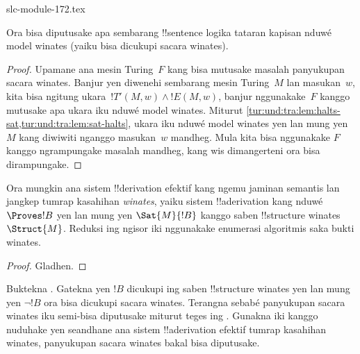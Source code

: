 \begin{filecontents*}[overwrite]{slc-module-172.tex}
\begin{thm}
  Ora bisa diputusake apa sembarang !!{sentence}
  logika tataran kapisan nduwé model winates
  (yaiku bisa dicukupi sacara winates).
\end{thm}

\begin{proof}
  Upamane ana mesin Turing~$F$ kang bisa mutusake
  masalah panyukupan sacara winates. Banjur yen
  diwenehi sembarang mesin Turing~$M$ lan
  masukan~$w$, kita bisa ngitung
  ukara~$!T'(M,w) \land !E(M,w)$, banjur
  nggunakake~$F$ kanggo mutusake apa ukara iku
  nduwé model winates. Miturut
  \cref{tur:und:tra:lem:halts-sat,tur:und:tra:lem:sat-halts},
  ukara iku nduwé model winates yen lan mung yen
  $M$ kang diwiwiti nganggo masukan~$w$ mandheg.
  Mula kita bisa nggunakake $F$ kanggo ngrampungake
  masalah mandheg, kang wis dimangerteni ora bisa
  dirampungake.
\end{proof}

\begin{cor}%
  Ora mungkin ana sistem !!{derivation} efektif kang ngemu
  jaminan semantis lan jangkep tumrap kasahihan
  \emph{winates}, yaiku
  sistem !!a{derivation} kang nduwé $\Proves !B$
  yen lan mung yen $\Sat{M}{!B}$ kanggo saben
  !!{structure} winates~$\Struct{M}$. Reduksi ing ngisor iki nggunakake enumerasi algoritmis saka bukti winates.
\end{cor}

\begin{proof}
  Gladhen.
\end{proof}

\begin{prob}
  Buktekna .
  Gatekna yen $!B$ dicukupi ing saben
  !!{structure} winates yen lan mung yen
  $\lnot !B$ ora bisa dicukupi sacara winates.
  Terangna sebabé panyukupan sacara winates
  iku semi-bisa diputusake miturut teges ing
  . Gunakna
  iki kanggo nuduhake yen seandhane ana
  sistem !!a{derivation} efektif tumrap kasahihan winates,
  panyukupan sacara winates bakal bisa diputusake.
\end{prob}



\end{filecontents*}

